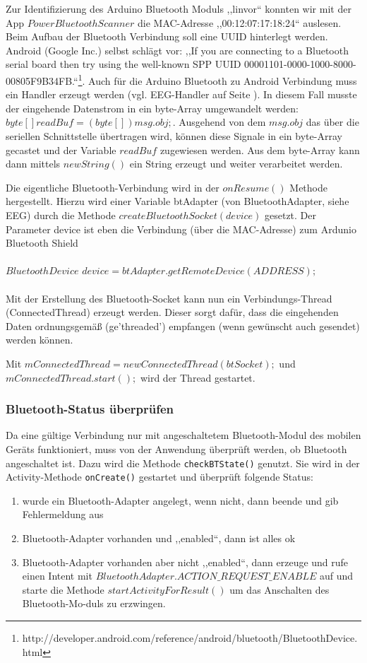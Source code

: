 	Zur Identifizierung des Arduino Bluetooth Moduls ,,linvor`` konnten wir mit der App $Power Bluetooth Scanner$ die MAC-Adresse ,,00:12:07:17:18:24`` auslesen. 
	Beim Aufbau der Bluetooth Verbindung soll eine UUID hinterlegt werden. Android (Google Inc.) selbst schlägt vor: ,,If you are connecting to a Bluetooth serial board then try using the well-known SPP UUID 00001101-0000-1000-8000-00805F9B34FB.``\footnote{http://developer.android.com/reference/android/bluetooth/BluetoothDevice.html}. 
	Auch für die Arduino Bluetooth zu Android Verbindung muss ein Handler erzeugt werden (vgl. EEG-Handler auf Seite \pageref{handler}).
	In diesem Fall musste der eingehende Datenstrom in ein byte-Array umgewandelt werden: $byte[] readBuf = (byte[]) msg.obj;$. Ausgehend von dem $msg.obj$ das über die seriellen Schnittstelle übertragen wird, können diese Signale in ein byte-Array gecastet und der Variable $readBuf$ zugewiesen werden. Aus dem byte-Array kann dann mittels $new String()$ ein String erzeugt und weiter verarbeitet werden.
	
	Die eigentliche Bluetooth-Verbindung wird in der $onResume()$ Methode hergestellt. Hierzu wird einer Variable btAdapter (von BluetoothAdapter, siehe EEG) durch die Methode $create BluetoothSocket(device)$ gesetzt. 
	Der Parameter device ist eben die Verbindung (über die MAC-Adresse) zum Ardunio Bluetooth Shield \\ \\
	$BluetoothDevice$ $device = btAdapter.getRemoteDevice(ADDRESS);$\\ \\
	Mit der Erstellung des Bluetooth-Socket kann nun ein Verbindungs-Thread (ConnectedThread) erzeugt werden. Dieser sorgt dafür, dass die eingehenden Daten ordnungsgemäß (ge'threaded') empfangen (wenn gewünscht auch gesendet) werden können. 
	
	Mit $mConnectedThread = new ConnectedThread(btSocket);$ und \\$mConnectedThread.start();$ wird der Thread gestartet.
	
	\subsubsection*{Bluetooth-Status überprüfen}
	
	Da eine gültige Verbindung nur mit angeschaltetem Bluetooth-Modul des mobilen Geräts funktioniert, muss von der Anwendung überprüft werden, ob Bluetooth angeschaltet ist. Dazu wird die Methode \texttt{checkBTState()} genutzt. Sie wird in der Activity-Methode \texttt{onCreate()} gestartet und überprüft folgende Status:
	\begin{enumerate}
	\item wurde ein Bluetooth-Adapter angelegt, wenn nicht, dann beende und gib Fehlermeldung aus
	\item Bluetooth-Adapter vorhanden und ,,enabled``, dann ist alles ok
	\item Bluetooth-Adapter vorhanden aber nicht ,,enabled``, dann erzeuge und rufe einen Intent mit $BluetoothAdapter.ACTION\_REQUEST\_ENABLE$ auf und starte die Methode $startActivityForResult()$ um das Anschalten des Bluetooth-Mo-duls zu erzwingen.
	\end{enumerate}
		
